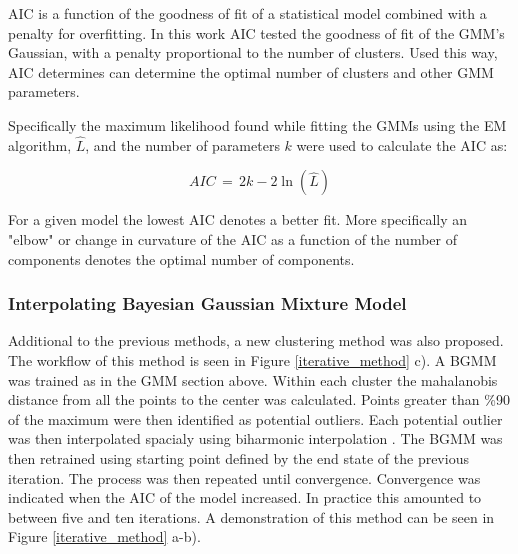 \documentclass[a4paper,11pt]{article}
\begin{document}
AIC is a function of the goodness of fit of a statistical model combined with a penalty for overfitting. In this work AIC tested the goodness of fit of the GMM's Gaussian, with a penalty proportional to the number of clusters. Used this way, AIC determines can determine the optimal number of clusters and other GMM parameters.

Specifically the maximum likelihood found while fitting the GMMs using the EM algorithm, $\hat L$, and the number of parameters $k$ were used to calculate the AIC as:

\begin{equation}
    AIC \, = \, 2k - 2\ln(\hat L)
\end{equation}

For a given model the lowest AIC denotes a better fit. More specifically an "elbow" or change in curvature of the AIC as a function of the number of components denotes the optimal number of components.

\subsubsection{Interpolating Bayesian Gaussian Mixture Model}

Additional to the previous methods, a new clustering method was also proposed. The workflow of this method is seen in Figure \ref{iterative_method} c). A BGMM was trained as in the GMM section above. Within each cluster the mahalanobis distance \cite{mahalanobis} from all the points to the center was calculated. Points greater than \%90 of the maximum were then identified as potential outliers. Each potential outlier was then interpolated spacialy using biharmonic interpolation \cite{Damelin2017OnAspects}. The BGMM was then retrained using starting point defined by the end state of the previous iteration. The process was then repeated until convergence. Convergence was indicated when the AIC of the model increased. In practice this amounted to between five and ten iterations. A demonstration of this method can be seen in Figure \ref{iterative_method} a-b).
\end{document}
